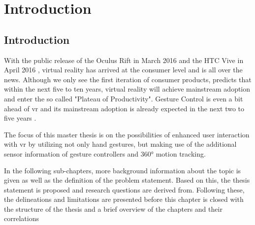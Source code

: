
\chapter{Introduction} %

\label{ChapterIntroduction} %


\section{Introduction}

With the public release of the Oculus Rift in March 2016 \citep{Oculus2016} and the HTC Vive in April 2016 \citep{Htcvive2016}, virtual reality has arrived at the consumer level and is all over the news. Although we only see the first iteration of consumer products, \cite{Gartner2015} predicts that within the next five to ten years, virtual reality will achieve mainstream adoption and enter the so called "Plateau of Productivity". Gesture Control is even a bit ahead of \gls{vr} and its mainstream adoption is already expected in the next two to five years \citep{Gartner2015}.

The focus of this master thesis is on the possibilities of enhanced user interaction with \gls{vr} by utilizing not only hand gestures, but making use of the additional sensor information of gesture controllers and 360° motion tracking.

In the following sub-chapters, more background information about the topic is given as well as the definition of the problem statement. Based on this, the thesis statement is proposed and research questions are derived from. Following these, the delineations and limitations are presented before this chapter is closed with the structure of the thesis and a brief overview of the chapters and their correlations




